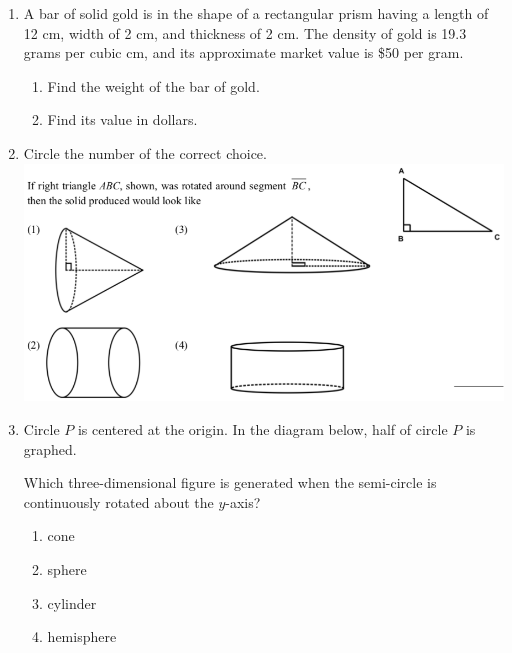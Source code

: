 \documentclass[12pt, twoside]{article}
\begin{document}
\begin{enumerate}
\item A bar of solid gold is in the shape of a rectangular prism having a length of 12 cm, width of 2 cm, and thickness of 2 cm. The density of gold is 19.3 grams per cubic cm, and its approximate market value is \$50 per gram.
  \begin{enumerate}
    \item Find the weight of the bar of gold.  \vspace{3cm}
    \item Find its value in dollars.
  \end{enumerate}

\newpage
\item Circle the number of the correct choice. \\
    \includegraphics[scale=0.42]{triangle-rotation.png}

\item %
  Circle $P$ is centered at the origin. In the diagram below, half of circle $P$ is graphed.
    \begin{center}
      \end{center}
    Which three-dimensional figure is generated when the semi-circle is continuously rotated about the $y$-axis?
    \begin{multicols}{2}
      \begin{enumerate}
      \item cone
      \item sphere
      \item cylinder
      \item hemisphere
      \end{enumerate}
    \end{multicols}


\end{enumerate}
\end{document}
